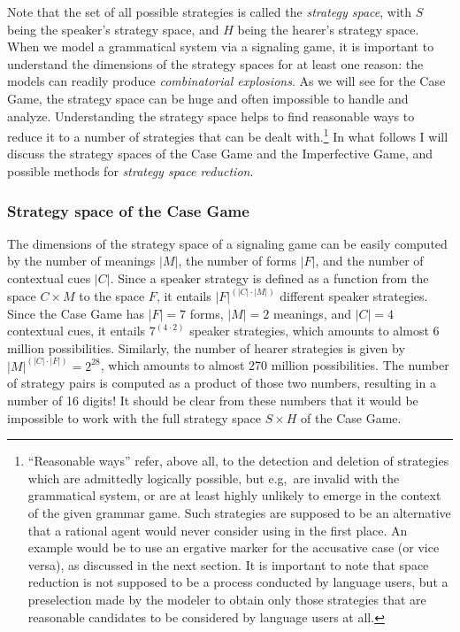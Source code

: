 \documentclass[output=paper,hidelinks]{langscibook}
\begin{document}
Note that the set of all possible strategies is called the \emph{strategy space}, with $S$ being the speaker's strategy space, and $H$ being the hearer's strategy space. When we model a grammatical system via a signaling game, it is important to understand the dimensions of the strategy spaces for at least one reason: the models can readily produce \emph{combinatorial explosions}. As we will see for the Case Game, the strategy space can be huge and often impossible to handle and analyze. Understanding the strategy space helps to find reasonable ways to reduce it to a number of strategies that can be dealt with.\footnote{``Reasonable ways'' refer, above all, to the detection and deletion of strategies which are admittedly logically possible, but e.g,~are invalid with the grammatical system, or are at least highly unlikely to emerge in the context of the given grammar game. Such strategies are supposed to be an alternative that a rational agent would never consider using in the first place. An example would be to use an ergative marker for the accusative case (or vice versa), as discussed in the next section. It is important to note that space reduction is not supposed to be a process conducted by language users, but a preselection made by the modeler to obtain only those strategies that are reasonable candidates to be considered by language users at all.} In what follows I will discuss the strategy spaces of the Case Game and the Imperfective Game, and possible methods for \emph{strategy space reduction}.

\subsubsection{Strategy space of the Case Game}

The dimensions of the strategy space of a signaling game can be easily computed by the number of meanings $|M|$, the number of forms $|F|$, and the number of contextual cues $|C|$. Since a speaker strategy is defined as a function from the space $C \times M$ to the space $F$, it entails $|F|^{(|C| \cdot |M|)}$ different speaker strategies. Since the Case Game has $|F|=7$ forms, $|M| = 2$ meanings, and $|C|=4$ contextual cues, it entails $7^{(4 \cdot 2)}$ speaker strategies, which amounts to almost 6 million possibilities. Similarly, the number of hearer strategies is given by $|M|^{(|C| \cdot |F|)} = 2^{28}$, which amounts to almost 270 million possibilities. The number of strategy pairs is computed as a product of those two numbers, resulting in a number of 16 digits! It should be clear from these numbers 
that it would be impossible to work with the full strategy space $S \times H$ of the Case Game.
\end{document}

